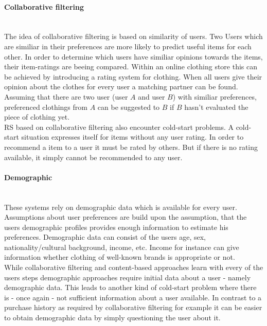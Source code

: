 \paragraph{Collaborative filtering}\hfill\\
The idea of collaborative filtering is based on similarity of users.
Two Users which are similiar in their preferences are more likely to predict useful items for each other.
In order to determine which users have similiar opinions towards the items, their item-ratings are beeing compared.
\citep[p.~291-292]{schafer:2007}
Within an online clothing store this can be achieved by introducing a rating system for clothing.
When all users give their opinion about the clothes for every user a matching partner can be found.
Assuming that there are two user (user $A$ and user $B$) with similiar preferences, preferenced clothings from $A$ can be suggested to $B$ if $B$ hasn't evaluated the piece of clothing yet.
\\
RS based on collaborative filtering also encounter cold-start problems.
A cold-start situation expresses itself for items without any user rating.
In order to recommend a item to a user it must be rated by others.
But if there is no rating available, it simply cannot be recommended to any user.
\citep[p.~378-379]{burke:2007}

\paragraph{Demographic}\hfill\\
These systems rely on demographic data which is available for every user.
Assumptions about user preferences are build upon the assumption, that the users demographic profiles provides enough information to estimate his preferences.
Demographic data can consist of the users age, sex, nationality/cultural background, income, etc.\citep[p.~12]{ricci:2011}
Income for instance can give information whether clothing of well-known brands is appropriate or not.
\\
While collaborative filtering and content-based approaches learn with every of the users steps demographic approaches require initial data about a user - namely demographic data.
This leads to another kind of cold-start problem where there is - once again - not sufficient information about a user available.
In contrast to a purchase history as required by collaborative filtering for example it can be easier to obtain demographic data by simply questioning the user about it.

